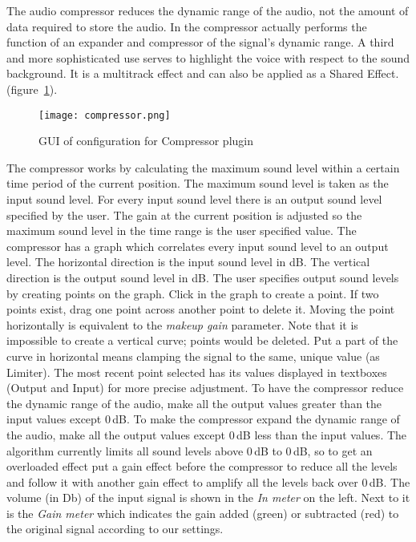 The audio compressor reduces the dynamic range of the audio, not the amount of data required to store the audio. In \CGG{} the compressor actually performs the function of an expander and compressor of the signal's dynamic range. A third and more sophisticated use serves to highlight the voice with respect to the sound background. It is a multitrack effect and can also be applied as a Shared Effect. (figure~\ref{fig:compressor}).

\begin{figure}[htpb]
    \centering
    \texttt{[image: compressor.png]}
    \caption{GUI of configuration for Compressor plugin}
    \label{fig:compressor}
\end{figure}

The compressor works by calculating the maximum sound level within a certain time period of the current position. The maximum sound level is taken as the input sound level. For every input sound level there is an output sound level specified by the user.
The gain at the current position is adjusted so the maximum sound level in the time range is the user specified value.
The compressor has a graph which correlates every input sound level to an output level. The horizontal direction is the input sound level in dB. The vertical direction is the output sound level in dB. The user specifies output sound levels by creating points on the graph. Click in the graph to create a point. If two points exist, drag one point across another point to delete it. Moving the point horizontally is equivalent to the \textit{makeup gain} parameter. Note that it is impossible to create a vertical curve; points would be deleted.
Put a part of the curve in horizontal means clamping the signal to the same, unique value (as Limiter).
The most recent point selected has its values displayed in textboxes (Output and Input) for more precise adjustment.
To have the compressor reduce the dynamic range of the audio, make all the output values greater than the input values except 0\,dB. To make the compressor expand the dynamic range of the audio, make all the output values except 0\,dB less than the input values. The algorithm currently limits all sound levels above 0\,dB to 0\,dB, so to get an overloaded effect put a gain effect before the compressor to reduce all the levels and follow it with another gain effect to amplify all the levels back over 0\,dB.
The volume (in Db) of the input signal is shown in the \textit{In meter} on the left. Next to it is the \textit{Gain meter} which indicates the gain added (green) or subtracted (red) to the original signal according to our settings.

